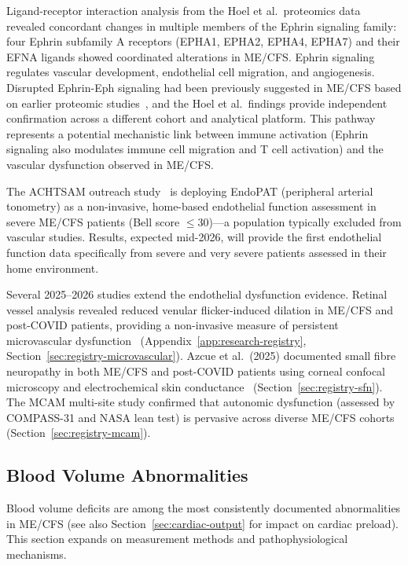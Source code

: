 Ligand-receptor interaction analysis from the Hoel et al.\ proteomics data~\cite{Hoel2026proteome} revealed concordant changes in multiple members of the Ephrin signaling family: four Ephrin subfamily A receptors (EPHA1, EPHA2, EPHA4, EPHA7) and their EFNA ligands showed coordinated alterations in ME/CFS. Ephrin signaling regulates vascular development, endothelial cell migration, and angiogenesis. Disrupted Ephrin-Eph signaling had been previously suggested in ME/CFS based on earlier proteomic studies~\cite{Germain2021plasma}, and the Hoel et al.\ findings provide independent confirmation across a different cohort and analytical platform. This pathway represents a potential mechanistic link between immune activation (Ephrin signaling also modulates immune cell migration and T cell activation) and the vascular dysfunction observed in ME/CFS.

The ACHTSAM outreach study~\cite{Fricke2026achtsam} is deploying EndoPAT
(peripheral arterial tonometry) as a non-invasive, home-based endothelial
function assessment in severe ME/CFS patients (Bell score $\leq$30)---a
population typically excluded from vascular studies. Results, expected mid-2026,
will provide the first endothelial function data specifically from severe and
very severe patients assessed in their home environment.

Several 2025--2026 studies extend the endothelial dysfunction evidence.
Retinal vessel analysis revealed reduced venular flicker-induced dilation in
ME/CFS and post-COVID patients, providing a non-invasive measure of
persistent microvascular dysfunction~\cite{MicrovascularRemodeling2026}
(Appendix~\ref{app:research-registry},
Section~\ref{sec:registry-microvascular}).  Azcue et al.\ (2025) documented
small fibre neuropathy in both ME/CFS and post-COVID patients using corneal
confocal microscopy and electrochemical skin
conductance~\cite{Azcue2025sfn}
(Section~\ref{sec:registry-sfn}).  The MCAM multi-site study confirmed that
autonomic dysfunction (assessed by COMPASS-31 and NASA lean test) is
pervasive across diverse ME/CFS
cohorts~\cite{MCAM2025autonomic}
(Section~\ref{sec:registry-mcam}).

\subsection{Blood Volume Abnormalities}
\label{sec:blood-volume}

Blood volume deficits are among the most consistently documented abnormalities in ME/CFS (see also Section~\ref{sec:cardiac-output} for impact on cardiac preload). This section expands on measurement methods and pathophysiological mechanisms.


